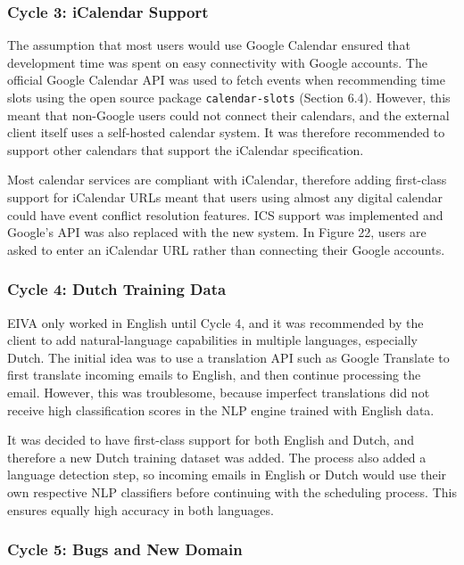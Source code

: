 \documentclass{article}
\begin{document}
\subsubsection{Cycle 3: iCalendar Support}

The assumption that most users would use Google Calendar ensured that development time was spent on easy connectivity with Google accounts. The official Google Calendar API was used to fetch events when recommending time slots using the open source package \texttt{calendar-slots} (Section 6.4). However, this meant that non-Google users could not connect their calendars, and the external client itself uses a self-hosted calendar system. It was therefore recommended to support other calendars that support the iCalendar specification.

Most calendar services are compliant with iCalendar, therefore adding first-class support for iCalendar URLs meant that users using almost any digital calendar could have event conflict resolution features. ICS support was implemented and Google's API was also replaced with the new system. In Figure 22, users are asked to enter an iCalendar URL rather than connecting their Google accounts.

\subsubsection{Cycle 4: Dutch Training Data}

EIVA only worked in English until Cycle 4, and it was recommended by the client to add natural-language capabilities in multiple languages, especially Dutch. The initial idea was to use a translation API such as Google Translate to first translate incoming emails to English, and then continue processing the email. However, this was troublesome, because imperfect translations did not receive high classification scores in the NLP engine trained with English data.

It was decided to have first-class support for both English and Dutch, and therefore a new Dutch training dataset was added. The process also added a language detection step, so incoming emails in English or Dutch would use their own respective NLP classifiers before continuing with the scheduling process. This ensures equally high accuracy in both languages.

\subsubsection{Cycle 5: Bugs and New Domain}
\end{document}
